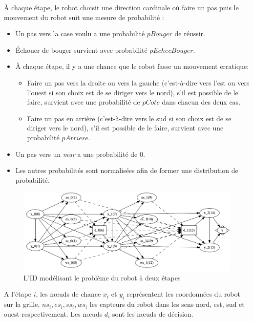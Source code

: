 \documentclass[12pt]{article}
\begin{document}
À chaque étape, le robot choisit une direction cardinale où faire un pas puis le mouvement du robot suit une mesure de probabilité :
\begin{itemize}
  \item Un pas vers la case voulu a une probabilité $pBouger$ de réussir.
  \item Échouer de bouger survient avec probabilité $pEchecBouger$.
  \item À chaque étape, il y a une chance que le robot fasse un mouvement erratique:
  \begin{itemize}
        \item Faire un pas vers la droite ou vers la gauche (c'est-à-dire vers l'est ou vers l'ouest si son choix est de se diriger vers le nord), s'il est possible de le faire, survient avec une probabilité de $pCote$ dans chacun des deux cas.
        \item Faire un pas en arrière (c'est-à-dire vers le sud si son choix est de se diriger vers le nord), s'il est possible de le faire, survient avec une probabilité $pArriere$.
        \end{itemize}
  \item Un pas vers un \textit{mur} a une probabilité de 0.
  \item Les autres probabilités sont normalisées afin de former une distribution de probabilité.
\end{itemize}
\begin{figure}[h]
\centering
\includegraphics[scale=0.22]{docs/ressources_rapport/IDROBOT.png}
\caption{L'ID modélisant le problème du robot à deux étapes }
\end{figure}
A l'étape $i$, les nœuds de chance $x_i$ et $y_i$ représentent les coordonnées du robot sur la grille, $ns_i, es_i, ss_i, ws_i$ les capteurs du robot dans les sens nord, est, sud et ouest respectivement. Les nœuds $d_i$ sont les nœuds de décision.
\end{document}
